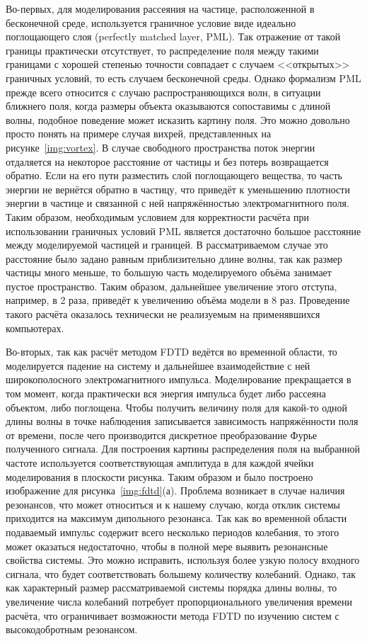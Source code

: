 Во-первых, для моделирования рассеяния на частице, расположенной в
бесконечной среде, используется граничное условие виде идеально
поглощающего слоя (perfectly matched layer, PML). Так отражение от
такой границы практически отсутствует, то распределение поля между
такими границами с хорошей степенью точности совпадает с случаем
<<открытых>> граничных условий, то есть случаем бесконечной среды.
Однако формализм PML прежде всего относится с случаю
распространяющихся волн, в ситуации ближнего поля, когда размеры
объекта оказываются сопоставимы с длиной волны, подобное поведение
может исказить картину поля. Это можно довольно просто понять на
примере случая вихрей, представленных на рисунке~\ref{img:vortex}.  В
случае свободного пространства поток энергии отдаляется на некоторое
расстояние от частицы и без потерь возвращается обратно. Если на его
пути разместить слой поглощающего вещества, то часть энергии не
вернётся обратно в частицу, что приведёт к уменьшению плотности
энергии в частице и связанной с ней напряжённостью электромагнитного
поля.  Таким образом, необходимым условием для корректности расчёта
при использовании граничных условий PML является достаточно большое
расстояние между моделируемой частицей и границей. В рассматриваемом
случае это расстояние было задано равным приблизительно длине волны,
так как размер частицы много меньше, то большую часть моделируемого
объёма занимает пустое пространство. Таким образом, дальнейшее
увеличение этого отступа, например, в 2 раза, приведёт к увеличению
объёма модели в 8 раз. Проведение такого расчёта оказалось технически
не реализуемым на применявшихся компьютерах.

Во-вторых, так как расчёт методом FDTD ведётся во временной области,
то моделируется падение на систему и дальнейшее взаимодействие с ней
широкополосного электромагнитного импульса.  Моделирование
прекращается в том момент, когда практически вся энергия импульса
будет либо рассеяна объектом, либо поглощена.  Чтобы получить величину
поля для какой-то одной длины волны в точке наблюдения записывается
зависимость напряжённости поля от времени, после чего производится
дискретное преобразование Фурье полученного сигнала. Для построения
картины распределения поля на выбранной частоте используется
соответствующая амплитуда в для каждой ячейки моделирования в
плоскости рисунка. Таким образом и было построено изображение для
рисунка~\ref{img:fdtd}(а). Проблема возникает в случае наличия
резонансов, что может относиться и к нашему случаю, когда отклик
системы приходится на максимум дипольного резонанса. Так как во
временной области подаваемый импульс содержит всего несколько периодов
колебания, то этого может оказаться недостаточно, чтобы в полной мере
выявить резонансные свойства системы.  Это можно исправить, используя
более узкую полосу входного сигнала, что будет соответствовать
большему количеству колебаний. Однако, так как характерный размер
рассматриваемой системы порядка длины волны, то увеличение числа
колебаний потребует пропорционального увеличения времени расчёта, что
ограничивает возможности метода FDTD по изучению систем с
высокодобротным резонансом.

